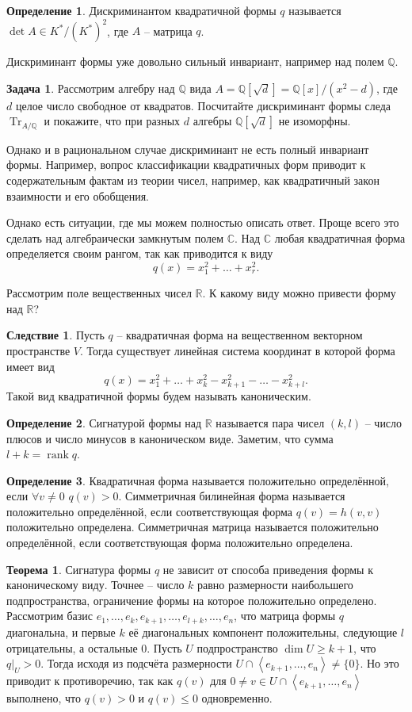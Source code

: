 \documentclass[10pt,a4paper,oneside]{book} %
\theoremstyle{definition}
\newtheorem{zad}{Задача}
\newtheorem*{defn}{Определение}
\newtheorem{thm}{Теорема}
\newtheorem{cor}{Следствие}
\newcommand{\mb}[1]{\mathbb{#1}}
\newcommand{\rank}{\operatorname{rank}}
\newcommand{\tr}{\operatorname{Tr}}
\def\lan{\left\langle }
\def\ran{\right\rangle}
\def\thrm{\begin{thm}}
\def\ethrm{\end{thm}}
\def\dfn{\begin{defn}}
\def\edfn{\end{defn}}
\def\zd{\begin{zad}}
\def\ezd{\end{zad}}
\def\crl{\begin{cor}}
\def\ecrl{\end{cor}}
\begin{document}
\dfn Дискриминантом квадратичной формы $q$ называется $\det A \in K^*/(K^*)^2$, где $A$ -- матрица $q$.
\edfn

Дискриминант формы уже довольно сильный инвариант, например над полем $\mb Q$.

\zd Рассмотрим алгебру над $\mb Q$ вида $A=\mb Q[\sqrt{d}]= \mb Q[x]/(x^2-d)$, где $d$ целое число свободное от квадратов. Посчитайте дискриминант формы следа $\tr_{A/\mb Q}$ и покажите, что при разных $d$ алгебры $\mb Q[\sqrt{d}]$ не изоморфны.
\ezd

Однако и в рациональном случае дискриминант не есть полный инвариант формы. Например, вопрос классификации квадратичных форм приводит к содержательным фактам из теории чисел, например, как квадратичный закон взаимности и его обобщения.

Однако есть ситуации, где мы можем полностью описать ответ.
Проще всего это сделать над алгебраически замкнутым полем $\mb C$. Над $\mb C$ любая квадратичная форма определяется своим рангом, так как приводится к виду $$q(x)=x_1^2+\dots+x_r^2.$$


Рассмотрим поле вещественных чисел $\mb R$. К какому виду можно привести форму над $\mb R$? 

\crl Пусть $q$ -- квадратичная форма на вещественном векторном пространстве $V$. Тогда существует линейная система координат в которой форма имеет вид $$q(x)= x_1^2+\dots + x_k^2 - x_{k+1}^2-\dots-x_{k+l}^2.$$
Такой вид квадратичной формы будем называть каноническим. 
\ecrl

\dfn Сигнатурой формы над $\mb R$ называется пара чисел $(k, l)$ -- число плюсов и число минусов в каноническом виде. Заметим, что сумма $l+k= \rank q$.
\edfn

\dfn Квадратичная форма называется положительно определённой, если $\forall v\neq 0$ $q(v)>0$. Симметричная билинейная форма называется положительно определённой, если соответствующая форма $q(v)=h(v,v)$ положительно определена. Симметричная матрица называется положительно определённой, если соответствующая форма положительно определена.
\edfn



\thrm Сигнатура формы $q$ не зависит от способа приведения формы к каноническому виду. Точнее -- число $k$ равно размерности наибольшего подпространства, ограничение формы  на которое положительно определено.
\proof Рассмотрим базис $e_1,\dots,e_k,e_{k+1},\dots,e_{l+k}, \dots, e_n$, что матрица формы $q$ диагональна, и первые $k$ её диагональных компонент положительны, следующие $l$ отрицательны, а остальные 0. 
Пусть $U$ подпространство $\dim U \geq k+1$, что $q|_{U}>0$. Тогда исходя из подсчёта размерности $U\cap \lan e_{k+1},\dots,e_n\ran \neq \{0\}$. Но это приводит к противоречию, так как $q(v)$ для $0\neq v \in U\cap \lan e_{k+1},\dots,e_n\ran $ выполнено, что $q(v)>0$ и $q(v)\leq 0$ одновременно.
\endproof
\ethrm
\end{document}
